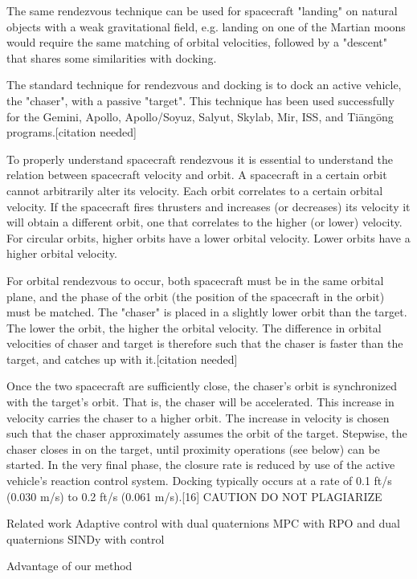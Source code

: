 \documentclass[letterpaper, preprint, paper,11pt]{AAS}	%
\begin{document}
The same rendezvous technique can be used for spacecraft "landing" on natural objects with a weak gravitational field, e.g. landing on one of the Martian moons would require the same matching of orbital velocities, followed by a "descent" that shares some similarities with docking.


The standard technique for rendezvous and docking is to dock an active vehicle, the "chaser", with a passive "target". This technique has been used successfully for the Gemini, Apollo, Apollo/Soyuz, Salyut, Skylab, Mir, ISS, and Tiāngōng programs.[citation needed]

To properly understand spacecraft rendezvous it is essential to understand the relation between spacecraft velocity and orbit. A spacecraft in a certain orbit cannot arbitrarily alter its velocity. Each orbit correlates to a certain orbital velocity. If the spacecraft fires thrusters and increases (or decreases) its velocity it will obtain a different orbit, one that correlates to the higher (or lower) velocity. For circular orbits, higher orbits have a lower orbital velocity. Lower orbits have a higher orbital velocity.

For orbital rendezvous to occur, both spacecraft must be in the same orbital plane, and the phase of the orbit (the position of the spacecraft in the orbit) must be matched. The "chaser" is placed in a slightly lower orbit than the target. The lower the orbit, the higher the orbital velocity. The difference in orbital velocities of chaser and target is therefore such that the chaser is faster than the target, and catches up with it.[citation needed]

Once the two spacecraft are sufficiently close, the chaser's orbit is synchronized with the target's orbit. That is, the chaser will be accelerated. This increase in velocity carries the chaser to a higher orbit. The increase in velocity is chosen such that the chaser approximately assumes the orbit of the target. Stepwise, the chaser closes in on the target, until proximity operations (see below) can be started. In the very final phase, the closure rate is reduced by use of the active vehicle's reaction control system. Docking typically occurs at a rate of 0.1 ft/s (0.030 m/s) to 0.2 ft/s (0.061 m/s).[16]
CAUTION DO NOT PLAGIARIZE


Related work
Adaptive control with dual quaternions
MPC with RPO and dual quaternions
SINDy with control


Advantage of our method
\end{document}
